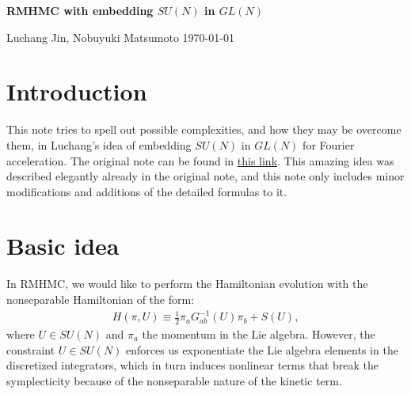 \documentclass[12pt]{article}
\begin{document}

\begin{center}
  {\Large \bf
    RMHMC with embedding $SU(N)$
    in $GL(N)$
  }
  \vspace{1.0cm}

  \centerline{
    Luchang Jin,
    Nobuyuki Matsumoto
    { \today }%
  }


\end{center}



\tableofcontents
\setcounter{footnote}{0}


\section{Introduction}
\label{sec:intro}

This note tries to spell out possible complexities,
and how they may be overcome them,
in Luchang's idea of
embedding $SU(N)$ in $GL(N)$ for Fourier acceleration.
The original note can be found in
\href{https://rbc.phys.columbia.edu/rbc_ukqcd/individual_postings/luchang/notes/2024-07-11-rmhmc-alg/note-v4.html}{this link}.
This amazing idea was described elegantly already in the original note,
and this note only includes minor modifications and additions of the detailed formulas to it.


\section{Basic idea}
\label{sec:idea}

In RMHMC, we would like to perform the Hamiltonian evolution with the
nonseparable Hamiltonian of the form:
\begin{align}
  H(\pi, U) \equiv \frac{1}{2} \pi_a G_{ab}^{-1}(U) \pi_b + S(U),
\end{align}
where $U \in SU(N)$ and $\pi_a$ the momentum in the Lie algebra.
However, the constraint $U \in SU(N)$
enforces us exponentiate the Lie algebra elements
in the discretized integrators,
which in turn induces nonlinear terms that break the symplecticity
because of the nonseparable nature of the kinetic term.
\end{document}
